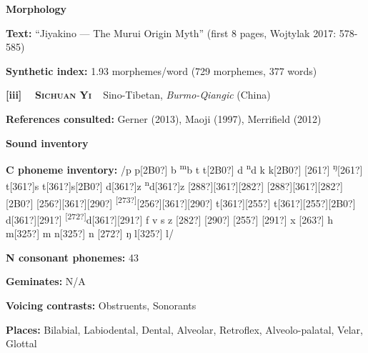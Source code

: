 \begin{styleBody}
\textbf{Morphology}
\end{styleBody}

\begin{styleBody}
\textbf{Text:} “Jiyakino — The Murui Origin Myth” (first 8 pages, Wojtylak 2017: 578-585)
\end{styleBody}

\begin{styleBody}
\textbf{Synthetic index: }1.93 morphemes/word (729 morphemes, 377 words)
\end{styleBody}

\clearpage\begin{styleBody}
\textbf{[iii] }\ \ \textbf{\textsc{Sichuan Yi}}\textbf{\ \ }Sino-Tibetan, \textit{Burmo-Qiangic} (China)
\end{styleBody}

\begin{styleBody}
\textbf{References consulted: }Gerner (2013), Maoji (1997), Merrifield (2012)
\end{styleBody}

\begin{styleBody}
\textbf{Sound inventory}
\end{styleBody}

\begin{styleBody}
\textbf{C phoneme inventory:} /p p[2B0?] b \textsuperscript{m}b t t[2B0?] d \textsuperscript{n}d k k[2B0?] [261?] \textsuperscript{ŋ}[261?] t[361?]s t[361?]s[2B0?] d[361?]z \textsuperscript{n}d[361?]z [288?][361?][282?] [288?][361?][282?][2B0?] [256?][361?][290?] \textsuperscript{[273?]}[256?][361?][290?] t[361?][255?] t[361?][255?][2B0?] d[361?][291?] \textsuperscript{[272?]}d[361?][291?] f v s z [282?] [290?] [255?] [291?] x [263?] h m[325?] m n[325?] n [272?] ŋ l[325?] l/
\end{styleBody}

\begin{styleBody}
\textbf{N consonant phonemes:} 43
\end{styleBody}

\begin{styleBody}
\textbf{Geminates:} N/A
\end{styleBody}

\begin{styleBody}
\textbf{Voicing contrasts:} Obstruents, Sonorants
\end{styleBody}

\begin{styleBody}
\textbf{Places:} Bilabial, Labiodental, Dental, Alveolar, Retroflex, Alveolo-palatal, Velar, Glottal
\end{styleBody}


